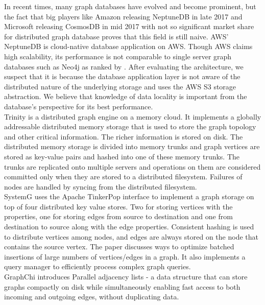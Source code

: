 \documentclass[letterpaper, 11 pt, conference]{ieeeconf}  %
\begin{document}
 In recent times, many graph databases have evolved and become prominent, but the fact that big players like Amazon releasing NeptuneDB\cite{neptunedb} in late 2017 and Microsoft releasing CosmosDB\cite{cosmosdb} in mid 2017 with not so significant market share for distributed graph database proves that this field is still naive. AWS' NeptuneDB\cite{neptunedb} is cloud-native database application on AWS. Though AWS claims high scalability, its performance is not comparable to single server graph databases such as Neo4j\cite{neo4j} as ranked by \cite{dbranking}. After evaluating the architecture, we suspect that it is because the database application layer is not aware of the distributed nature of the underlying storage and uses the AWS S3 storage abstraction. We believe that knowledge of data locality is important from the database's perspective for its best performance.\\
 
 Trinity\cite{trinity} is a distributed graph engine on a memory cloud. It implements a globally addressable distributed memory storage that is used to store the graph topology and other critical information. The richer information is stored on disk. The distributed memory storage is divided into memory trunks and graph vertices are stored as key-value pairs and hashed into one of these memory trunks. The trunks are replicated onto multiple servers and operations on them are considered committed only when they are stored to a distributed filesystem. Failures of nodes are handled by syncing from the distributed filesystem.\\
 
 SystemG\cite{systemg} uses the Apache TinkerPop interface to  implement a graph storage on top of four distributed key value stores. Two for storing vertices with the properties, one for storing edges from source to destination and one from destination to source along with the edge properties. Consistent hashing is used to distribute vertices among nodes, and edges are always stored on the node that contains the source vertex. The paper discusses ways to optimize batched insertions of large numbers of vertices/edges in a graph. It also implements a query manager to efficiently process complex graph queries.\\ 
 
 GraphChi\cite{graphchi} introduces Parallel adjacency lists - a data structure that can store graphs compactly on disk while simultaneously enabling fast access to both incoming and outgoing edges, without duplicating data.\\
 
\end{document}
